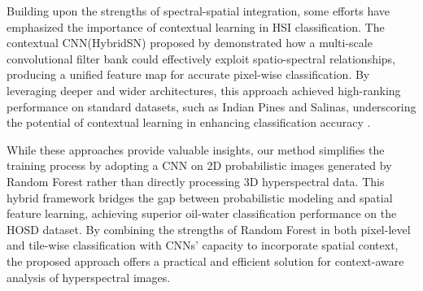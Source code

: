 Building upon the strengths of spectral-spatial integration, some efforts have emphasized the importance of contextual learning in HSI classification. The contextual CNN(HybridSN) proposed by \cite{zhang2020contextualcnn} demonstrated how a multi-scale convolutional filter bank could effectively exploit spatio-spectral relationships, producing a unified feature map for accurate pixel-wise classification. By leveraging deeper and wider architectures, this approach achieved high-ranking performance on standard datasets, such as Indian Pines and Salinas, underscoring the potential of contextual learning in enhancing classification accuracy \cite{zhang2020contextualcnn}.

While these approaches provide valuable insights, our method simplifies the training process by adopting a CNN on 2D probabilistic images generated by Random Forest rather than directly processing 3D hyperspectral data. This hybrid framework bridges the gap between probabilistic modeling and spatial feature learning, achieving superior oil-water classification performance on the HOSD dataset. By combining the strengths of Random Forest in both pixel-level and tile-wise classification with CNNs’ capacity to incorporate spatial context, the proposed approach offers a practical and efficient solution for context-aware analysis of hyperspectral images.
